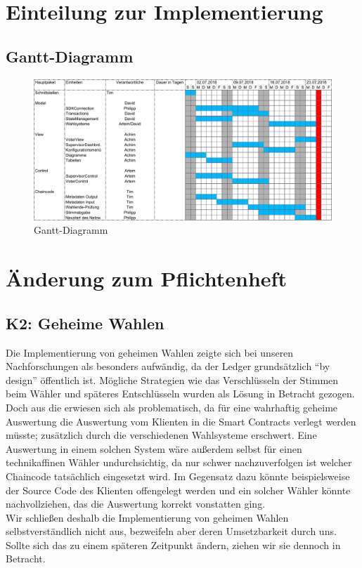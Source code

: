 \documentclass[parskip=full]{scrartcl}
\begin{document}
  	\section{Einteilung zur Implementierung}
	\subsection{Gantt-Diagramm}
	\begin{figure}[!h]
		\centering
		\includegraphics[width=\textwidth]{pictures/Gantt.pdf}
		\caption{Gantt-Diagramm}
		\label{fig:gantt}
	\end{figure}
	\section{Änderung zum Pflichtenheft}
	\subsection{K2: Geheime Wahlen}
	Die Implementierung von geheimen Wahlen zeigte sich bei unseren Nachforschungen als besonders aufwändig, da der Ledger grundsätzlich \enquote{by design} öffentlich ist. Mögliche Strategien wie das Verschlüsseln der Stimmen beim Wähler und späteres Entschlüsseln wurden als Lösung in Betracht gezogen. Doch aus die erwiesen sich als problematisch, da für eine wahrhaftig geheime Auswertung die Auswertung vom Klienten in die Smart Contracts verlegt werden müsste; zusätzlich durch die verschiedenen Wahlsysteme erschwert. Eine Auswertung in einem solchen System wäre außerdem selbst für einen technikaffinen Wähler undurchsichtig, da nur schwer nachzuverfolgen ist welcher Chaincode tatsächlich eingesetzt wird. Im Gegensatz dazu könnte beispielsweise der Source Code des Klienten offengelegt werden und ein solcher Wähler könnte nachvollziehen, das die Auswertung korrekt vonstatten ging. \\ Wir schließen deshalb die Implementierung von geheimen Wahlen selbstverständlich nicht aus, bezweifeln aber deren Umsetzbarkeit durch uns. Sollte sich das zu einem späteren Zeitpunkt ändern, ziehen wir sie dennoch in Betracht.
\end{document}
